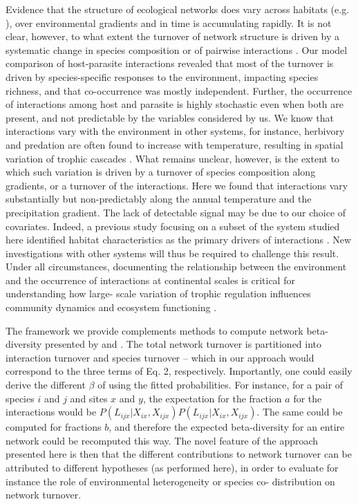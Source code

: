 \documentclass[12pt]{article}
\begin{document}
Evidence that the structure of ecological networks does vary across habitats
(e.g. \citealt{Tylianakis2007}), over environmental gradients
\citep{Lurgi2012} and in time \citep{Simanonok2014} is accumulating
rapidly. It is not clear, however, to what extent the turnover of network
structure is driven by a systematic change in species composition or of
pairwise interactions \citep{Poisot2012, Poisot2015a}. Our model comparison of
host-parasite interactions revealed that most of the turnover is driven by
species-specific responses to the environment, impacting species richness, and
that co-occurrence was mostly independent. Further, the occurrence of interactions
among host and parasite is highly stochastic even when both are present, and
not predictable by the variables considered by us. We know that interactions
vary with the environment in other systems, for instance, herbivory
\citep{Shurin2012, Baskett2018} and predation \citep{Mckinnon2010,
Legagneux2014} are often found to increase with temperature, resulting in
spatial variation of trophic cascades \citep{Gray2016}. What remains unclear,
however, is the extent to which such variation is driven by a turnover of
species composition along gradients, or a turnover of the interactions. Here
we found that interactions vary substantially but non-predictably along the
annual temperature and the precipitation gradient. The lack of detectable
signal may be due to our choice of covariates. Indeed, a previous study focusing on a subset of the system studied here identified habitat characteristics as the primary drivers of
interactions \citep{Nyman2015}. New investigations with other systems will
thus be required to challenge this result. Under all circumstances,
documenting the relationship between the environment and the occurrence of
interactions at continental scales is critical for understanding how large-
scale variation of trophic regulation influences community dynamics and
ecosystem functioning \citep{Harfoot2014}.

The framework we provide complements methods to compute network beta-diversity
presented by \citealt{Poisot2012} and \citealt{Poisot2018}. The total network
turnover is partitioned into interaction turnover and species turnover – which
in our approach would correspond to the three terms of Eq. 2, respectively.
Importantly, one could easily derive the different $\beta$ of
\citealt{Poisot2012} using the fitted probabilities. For instance, for a pair
of species $i$ and $j$ and sites $x$ and $y$, the expectation for the fraction
$a$ for the interactions would be
$P(L_{ijx}|X_{ix},X_{ijx})P(L_{ijx}|X_{ix},X_{ijx})$. The same could be
computed for fractions $b$, and therefore the expected beta-diversity for an
entire network could be recomputed this way. The novel feature of the approach
presented here is then that the different contributions to network turnover
can be attributed to different hypotheses (as performed here), in order to
evaluate for instance the role of environmental heterogeneity or species co-
distribution on network turnover.
\end{document}

